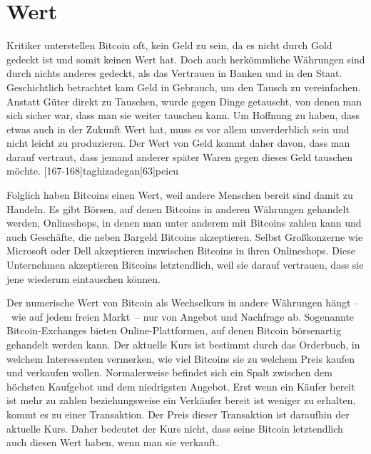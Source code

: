 \section{Wert}

Kritiker unterstellen Bitcoin oft, kein Geld zu sein, da es nicht durch Gold gedeckt ist und somit keinen Wert hat.
Doch auch herkömmliche Währungen sind durch nichts anderes gedeckt, als das Vertrauen in Banken und in den Staat.
Geschichtlich betrachtet kam Geld in Gebrauch, um den Tausch zu vereinfachen.
Anstatt Güter direkt zu Tauschen, wurde gegen Dinge getauscht, von denen man sich sicher war, dass man sie weiter tauschen kann.
Um Hoffnung zu haben, dass etwas auch in der Zukunft Wert hat, muss es vor allem unverderblich sein und nicht leicht zu produzieren.
Der Wert von Geld kommt daher davon, dass man darauf vertraut, dass jemand anderer später Waren gegen dieses Geld tauschen möchte.
[167-168]{taghizadegan}[63]{peicu}

Folglich haben Bitcoins einen Wert, weil andere Menschen bereit sind damit zu Handeln.
Es gibt Börsen, auf denen Bitcoins in anderen Währungen gehandelt werden, Onlineshops, in denen man unter anderem mit Bitcoins zahlen kann und auch Geschäfte, die neben Bargeld Bitcoins akzeptieren.
Selbst Großkonzerne wie Microsoft oder Dell akzeptieren inzwischen Bitcoins in ihren Onlineshops.
Diese Unternehmen akzeptieren Bitcoins letztendlich, weil sie darauf vertrauen, dass sie jene wiederum eintauschen können.

Der numerische Wert von Bitcoin als Wechselkurs in andere Währungen hängt --~wie auf jedem freien Markt~-- nur von Angebot und Nachfrage ab.
Sogenannte Bitcoin-Exchanges bieten Online-Plattformen, auf denen Bitcoin börsenartig gehandelt werden kann.
Der aktuelle Kurs ist bestimmt durch das Orderbuch, in welchem Interessenten vermerken, wie viel Bitcoins sie zu welchem Preis kaufen und verkaufen wollen.
Normalerweise befindet sich ein Spalt zwischen dem höchsten Kaufgebot und dem niedrigsten Angebot.
Erst wenn ein Käufer bereit ist mehr zu zahlen beziehungsweise ein Verkäufer bereit ist weniger zu erhalten, kommt es zu einer Transaktion.
Der Preis dieser Transaktion ist daraufhin der aktuelle Kurs.
Daher bedeutet der Kurs nicht, dass seine Bitcoin letztendlich auch diesen Wert haben, wenn man sie verkauft.
